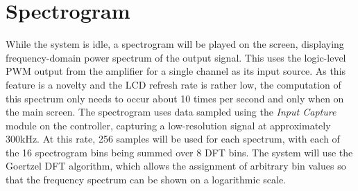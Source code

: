 \section{Spectrogram}
\label{sec:spectrogram}
While the system is idle, a spectrogram will be played on the screen, displaying frequency-domain power spectrum of the output signal. This uses the logic-level PWM output from the amplifier for a single channel as its input source. As this feature is a novelty and the LCD refresh rate is rather low, the computation of this spectrum only needs to occur about 10 times per second and only when on the main screen. The spectrogram uses data sampled using the \emph{Input Capture} module on the controller, capturing a low-resolution signal at approximately 300kHz. At this rate, 256 samples will be used for each spectrum, with each of the 16 spectrogram bins being summed over 8 DFT bins. The system will use the Goertzel DFT algorithm, which allows the assignment of arbitrary bin values so that the frequency spectrum can be shown on a logarithmic scale.  
